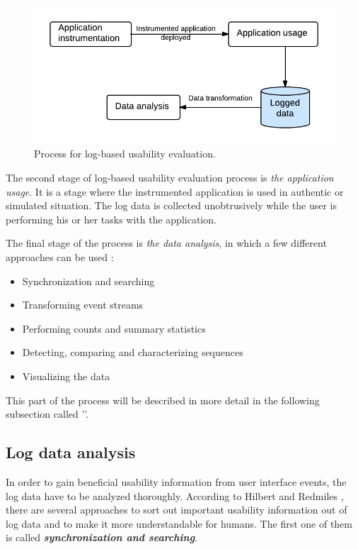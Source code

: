 \documentclass[12pt,a4paper,oneside,pdftex]{report}
\begin{document}
\begin{figure}[H]
  	\centerline{
  	\includegraphics[width=1.0\textwidth]{./images/logging_usability_process.png}
  	}
  	\caption{Process for log-based usability evaluation. \cite{RefWorks:24}}
	\label{fig:logging_usability_process}
\end{figure}

The second stage of log-based usability evaluation process is \emph{the application usage}. It is a stage where the instrumented application is used in authentic or simulated situation. The log data is collected unobtrusively while the user is performing his or her tasks with the application. \cite{RefWorks:24}

The final stage of the process is \emph{the data analysis}, in which a few different approaches can be used \cite{RefWorks:24, RefWorks:25}:
\begin{itemize}
  \item Synchronization and searching
  \item Transforming event streams
  \item Performing counts and summary statistics
  \item Detecting, comparing and characterizing sequences 
  \item Visualizing the data
\end{itemize}
This part of the process will be described in more detail in the following subsection called ''.

\subsection{Log data analysis}
\label{sec:analysis}
In order to gain beneficial usability information from user interface events, the log data have to be analyzed thoroughly. According to  Hilbert and Redmiles \cite{RefWorks:25}, there are several approaches to sort out important usability information out of log data and to make it more understandable for humans.
The first one of them is called \textbf{\emph{synchronization and searching}}. 
\end{document}

